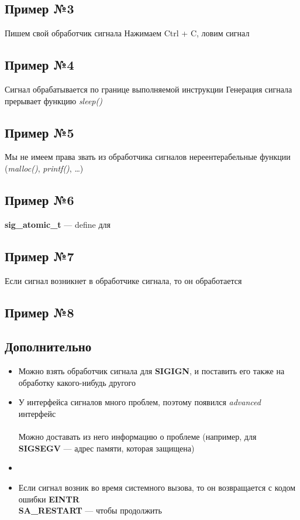 \documentclass[../../lectures.tex]{subfiles}
\begin{document}
\subsection{Пример №3}
Пишем свой обработчик сигнала
Нажимаем Ctrl + C, ловим сигнал

\subsection{Пример №4}
Сигнал обрабатывается по границе выполняемой инструкции
Генерация сигнала прерывает функцию \emph{sleep()}

\subsection{Пример №5}
Мы не имеем права звать из обработчика сигналов нереентерабельные функции (\emph{malloc()}, \emph{printf()}, \dots)

\subsection{Пример №6}
\textbf{sig\_atomic\_t} --- define для 

\subsection{Пример №7}
Если сигнал возникнет в обработчике сигнала, то он обработается

\subsection{Пример №8}

\subsection{Дополнительно}
\begin{itemize}
    \item Можно взять обработчик сигнала для \textbf{SIGIGN}, и поставить его также на обработку какого-нибудь другого

    \item У интерфейса сигналов много проблем, поэтому появился \emph{advanced} интерфейс\\
          \\
          Можно доставать из него информацию о проблеме (например, для \textbf{SIGSEGV} --- адрес памяти, которая защищена)

    \item {}

    \item Если сигнал возник во время системного вызова, то он возвращается с кодом ошибки \textbf{EINTR}\\
          \textbf{SA\_RESTART} --- чтобы продолжить
\end{itemize}
\end{document}
